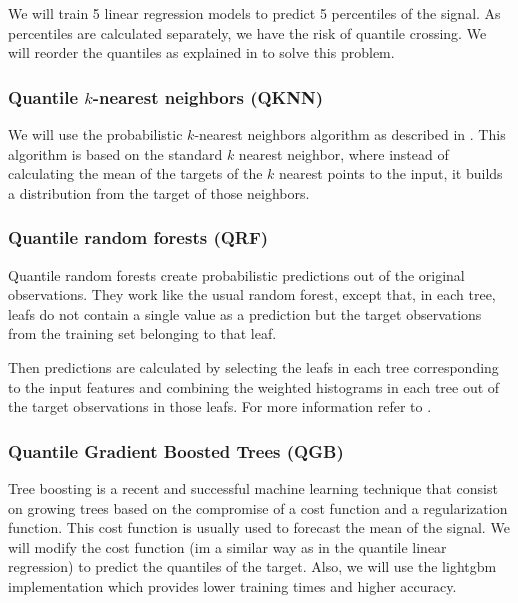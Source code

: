 \documentclass[a4paper,twocolumn,5p]{elsarticle}
\begin{document}
We will train 5 linear regression models to predict 5 percentiles of
the signal. As percentiles are calculated separately, we have the risk
of quantile crossing.  We will reorder the quantiles as explained in
\cite{cross} to solve this problem.

\subsubsection{Quantile $k$-nearest neighbors (QKNN)}

We will use the probabilistic $k$-nearest neighbors algorithm as
described in \cite{quantileknnmangalova}.  This algorithm is based on
the standard $k$ nearest neighbor, where instead of calculating the
mean of the targets of the $k$ nearest points to the input, it builds
a distribution from the target of those neighbors.

\subsubsection{Quantile random forests (QRF)}

Quantile random forests create probabilistic predictions out of the
original observations. They work like the usual random forest, except
that, in each tree, leafs do not contain a single value as a
prediction but the target observations from the training set belonging
to that
leaf.

Then predictions are calculated by selecting the leafs in each tree
corresponding to the input features and combining the weighted
histograms in each tree out of the target observations in those leafs.
For more information refer to \cite{quantregforests}.

\subsubsection{Quantile Gradient Boosted Trees (QGB)}

Tree boosting \cite{friedman_greedy_2001} is a recent and successful
machine learning technique that consist on growing trees based on the
compromise of a cost function and a regularization function. This cost
function is usually used to forecast the mean of the signal. We will
modify the cost function (im a similar way as in the quantile linear
regression) to predict the quantiles of the target. Also, we will use 
the lightgbm implementation \cite{ke_lightgbm:_2017} which provides 
lower training times and higher accuracy.
\end{document}
